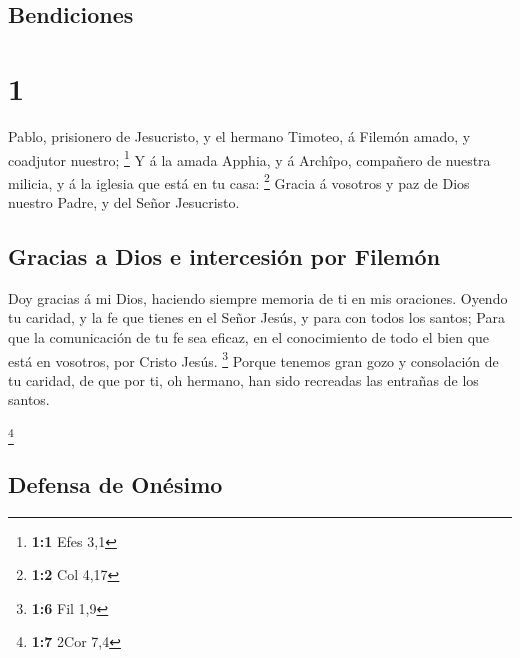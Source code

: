\hypertarget{bendiciones}{%
\subsection{Bendiciones}\label{bendiciones}}

\hypertarget{section}{%
\section{1}\label{section}}

 Pablo, prisionero de Jesucristo, y el hermano Timoteo, á
Filemón amado, y coadjutor nuestro; \footnote{\textbf{1:1} Efes 3,1}
 Y á la amada Apphia, y á Archîpo, compañero de nuestra
milicia, y á la iglesia que está en tu casa: \footnote{\textbf{1:2} Col
  4,17}  Gracia á vosotros y paz de Dios nuestro Padre, y
del Señor Jesucristo.

\hypertarget{gracias-a-dios-e-intercesiuxf3n-por-filemuxf3n}{%
\subsection{Gracias a Dios e intercesión por
Filemón}\label{gracias-a-dios-e-intercesiuxf3n-por-filemuxf3n}}

 Doy gracias á mi Dios, haciendo siempre memoria de ti en
mis oraciones.  Oyendo tu caridad, y la fe que tienes en
el Señor Jesús, y para con todos los santos;  Para que la
comunicación de tu fe sea eficaz, en el conocimiento de todo el bien que
está en vosotros, por Cristo Jesús. \footnote{\textbf{1:6} Fil 1,9}
 Porque tenemos gran gozo y consolación de tu caridad, de
que por ti, oh hermano, han sido recreadas las entrañas de los santos.

\footnote{\textbf{1:7} 2Cor 7,4}

\hypertarget{defensa-de-onuxe9simo}{%
\subsection{Defensa de Onésimo}\label{defensa-de-onuxe9simo}}

